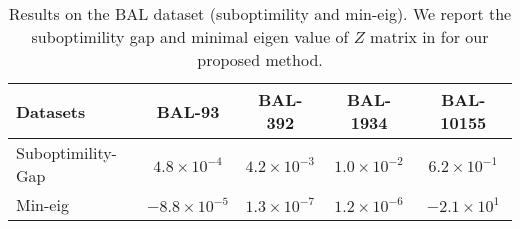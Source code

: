 \begin{table}[t]
    \centering
    \caption{\textnormal{Results on the BAL dataset (suboptimility and min-eig). We report the suboptimility gap and minimal eigen value of $Z$ matrix in  for our proposed \nameshort method.
    }}
    \label{tab:bal-xm}
    \begin{adjustbox}{width=\linewidth}
    \begin{tabular}{l|c|c|c|c|}
        \toprule
        Datasets & \multicolumn{1}{c|}{BAL-93} & \multicolumn{1}{c|}{BAL-392} & \multicolumn{1}{c|}{BAL-1934} & \multicolumn{1}{c|}{BAL-10155} \\
        \midrule
        Suboptimility-Gap & $4.8 \times 10^{-4}$ & $4.2 \times 10^{-3}$ & $1.0 \times 10^{-2}$ & $6.2 \times 10^{-1}$ \\
        \midrule
        Min-eig & $-8.8 \times 10^{-5}$ & $1.3 \times 10^{-7}$ & $1.2 \times 10^{-6}$ & $-2.1 \times 10^{1}$ \\

        \bottomrule
    \end{tabular}
\end{adjustbox}
\vspace{-3mm}
\end{table}